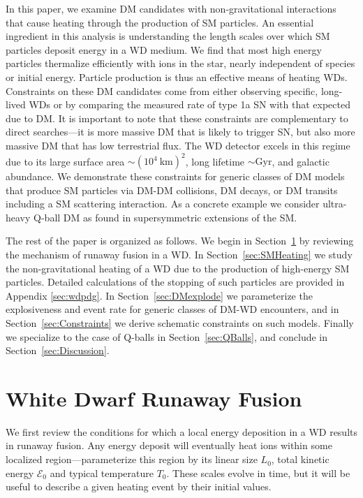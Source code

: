 \documentclass[twocolumn, preprintnumbers,amsmath,amssymb,prd, superscriptaddress]{revtex4}
\newcommand{\Ez}{\mathcal{E}_0}
\begin{document}
In this paper, we examine DM candidates with non-gravitational interactions that cause heating through the production of SM particles.
An essential ingredient in this analysis is understanding the length scales over which SM particles deposit energy in a WD medium.
We find that most high energy particles thermalize efficiently with ions in the star, nearly independent of species or initial energy.
Particle production is thus an effective means of heating WDs. 
Constraints on these DM candidates come from either observing specific, long-lived WDs or by comparing the measured rate of type 1a SN with that expected due to DM.
It is important to note that these constraints are complementary to direct searches---it is more massive DM that is likely to trigger SN, but also more massive DM that has low terrestrial flux.
The WD detector excels in this regime due to its large surface area $\sim (10^4 ~\text{km})^2$, long lifetime $\sim \text{Gyr}$, and galactic abundance.
We demonstrate these constraints for generic classes of DM models that produce SM particles via DM-DM collisions, DM decays, or DM transits including a SM scattering interaction.
As a concrete example we consider ultra-heavy Q-ball DM as found in supersymmetric extensions of the SM. 

The rest of the paper is organized as follows.
We begin in Section~\ref{sec:Review} by reviewing the mechanism of runaway fusion in a WD.
In Section~\ref{sec:SMHeating} we study the non-gravitational heating of a WD due to the production of high-energy SM particles.
Detailed calculations of the stopping of such particles are provided in Appendix \ref{sec:wdpdg}.
In Section~\ref{sec:DMexplode} we parameterize the explosiveness and event rate for generic classes of DM-WD encounters, and in Section~\ref{sec:Constraints} we derive schematic constraints on such models. 
Finally we specialize to the case of Q-balls in Section~\ref{sec:QBalls}, and conclude in Section~\ref{sec:Discussion}.

\section{White Dwarf Runaway Fusion}
\label{sec:Review}

We first review the conditions for which a local energy deposition in a WD results in runaway fusion.
Any energy deposit will eventually heat ions within some localized region---parameterize this region by its linear size $L_0$, total kinetic energy $\Ez$ and typical temperature $T_0$.
These scales evolve in time, but it will be useful to describe a given heating event by their initial values.
\end{document}
